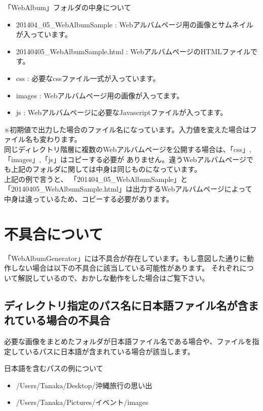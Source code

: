 \documentclass[]{jsarticle}
\begin{document}
\begin{itembox}[l]{「WebAlbum」フォルダの中身について}
 \begin{itemize}
   \item 201404\_05\_WebAlbumSample : Webアルバムページ用の画像とサムネイルが入っています。
   \item 20140405\_WebAlbumSample.html : WebアルバムページのHTMLファイルです。 
   \item css : 必要なcssファイル一式が入っています。
   \item images : Webアルバムページ用の画像が入ってます。
   \item js : Webアルバムページに必要なJavascriptファイルが入ってます。
 \end{itemize}
\end{itembox} 

※初期値で出力した場合のファイル名になっています。入力値を変えた場合はファイル名も変わります。\\

同じディレクトリ階層に複数のWebアルバムページを公開する場合は、「css」, 「images」,「js」はコピーする必要が
ありません。違うWebアルバムページでも上記のフォルダに関しては中身は同じものになっています。\\

上記の例で言うと、
「201404\_05\_WebAlbumSample」と「20140405\_WebAlbumSample.html」は出力するWebアルバムページによって
中身は違っているため、コピーする必要があります。

\newpage

\section{不具合について}

「WebAlbumGenerator」には不具合が存在しています。もし意図した通りに動作しない場合は以下の不具合に該当している可能性があります。
それぞれについて解説しているので、おかしな動作をした場合はご覧下さい。

\subsection{ディレクトリ指定のパス名に日本語ファイル名が含まれている場合の不具合}
必要な画像をまとめたフォルダが日本語ファイル名である場合や、ファイルを指定しているパスに日本語が含まれている場合が該当します。\\

\begin{itembox}[l]{日本語を含むパスの例について}
 \begin{itemize}
   \item /Users/Tanaka/Desktop/沖縄旅行の思い出
   \item /Users/Tanaka/Pictures/イベント/images 
 \end{itemize}
\end{itembox} 
\end{document}
